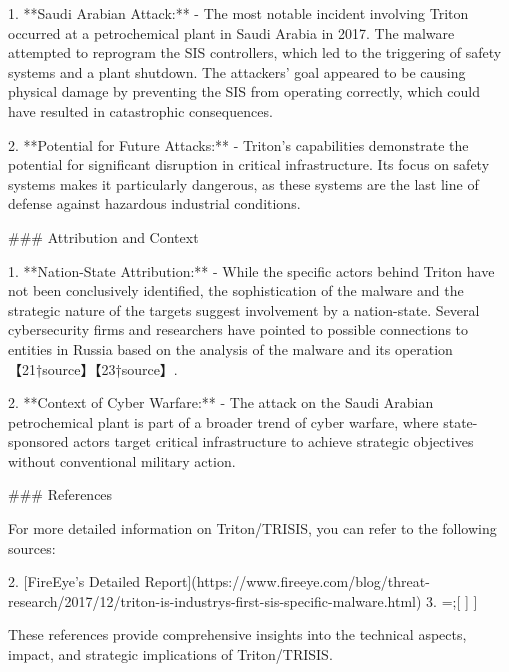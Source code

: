 1. **Saudi Arabian Attack:**
   - The most notable incident involving Triton occurred at a petrochemical plant in Saudi Arabia in 2017. The malware attempted to reprogram the SIS controllers, which led to the triggering of safety systems and a plant shutdown. The attackers' goal appeared to be causing physical damage by preventing the SIS from operating correctly, which could have resulted in catastrophic consequences.

2. **Potential for Future Attacks:**
   - Triton’s capabilities demonstrate the potential for significant disruption in critical infrastructure. Its focus on safety systems makes it particularly dangerous, as these systems are the last line of defense against hazardous industrial conditions.

### Attribution and Context

1. **Nation-State Attribution:**
   - While the specific actors behind Triton have not been conclusively identified, the sophistication of the malware and the strategic nature of the targets suggest involvement by a nation-state. Several cybersecurity firms and researchers have pointed to possible connections to entities in Russia based on the analysis of the malware and its operation【21†source】【23†source】.

2. **Context of Cyber Warfare:**
   - The attack on the Saudi Arabian petrochemical plant is part of a broader trend of cyber warfare, where state-sponsored actors target critical infrastructure to achieve strategic objectives without conventional military action.

### References

For more detailed information on Triton/TRISIS, you can refer to the following sources:


2. [FireEye’s Detailed Report](https://www.fireeye.com/blog/threat-research/2017/12/triton-is-industrys-first-sis-specific-malware.html)
3. =;[
]
]

These references provide comprehensive insights into the technical aspects, impact, and strategic implications of Triton/TRISIS.